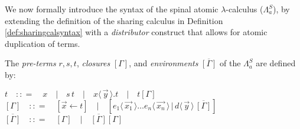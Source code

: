 \documentclass[a4paper,UKenglish,cleveref, autoref]{lipics-v2019}
\newcommand{\FALC}{\Lambda^{S}_{a}}
\newcommand{\app}[2]{#1 \, #2}
\newcommand{\fake}[3]{#1 \langle \, #2 \, \rangle . #3}
\newcommand{\dist}[5]{#1 [ #2 \, \vert \, \fakedist{#4}{#5} \, #3 ]}
\newcommand{\fakedist}[2]{#1 \langle \, #2 \, \rangle}
\newcommand{\sharerule}{\triangle}
\begin{document}
%

We now formally introduce the syntax of the spinal atomic $\lambda$-calculus ($\FALC$), by extending the definition of the sharing calculus in Definition \ref{def:sharingcalsyntax} with a \emph{distributor} construct that allows for atomic duplication of terms. 

\begin{definition} The \emph{pre-terms} $r, s, t$, \emph{closures} $[\Gamma]$, and \emph{environments} $\overline{[\Gamma]}$ of the $\FALC$ are defined by:

\begin{center}
$t \quad {:}{:}{=} \quad x \quad \vert \quad \app{s}{t} \quad \vert \quad \fake{x}{\vec{y}}{t} \quad \vert \quad t[\Gamma]$ 
\\[0.2cm]
$[\Gamma] \quad {:}{:}{=} \quad  [\vec{x} \leftarrow t] \quad \vert \quad \dist{}{\fakedist{e_{1}}{\vec{x_{1}}} \dots \fakedist{e_{n}}{\vec{x_{n}}}}{\overline{[\Gamma]}}{d}{\vec{y}}$  \quad \quad $\overline{[\Gamma]} \quad {:}{:}{=} \quad [\Gamma] \quad \vert \quad \overline{[\Gamma]}[\Gamma]$
\end{center}

\end{definition}
\end{document}
